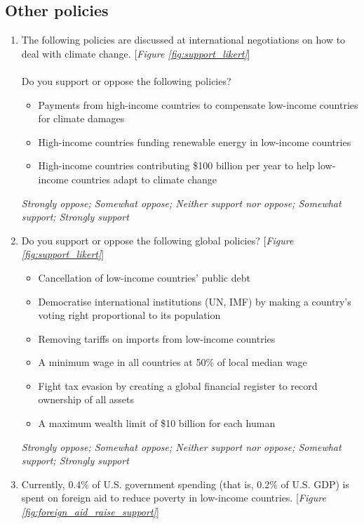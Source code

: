\subsection*{Other policies}
\begin{enumerate}[resume] \item \label{q:climate_policies} The following policies are discussed  at international negotiations on how to deal with climate change. [\textit{Figure \ref{fig:support_likert}}]\\
\\
Do you support or oppose the following policies?
\begin{itemize}
    \item Payments from high-income countries to compensate low-income countries for climate damages 
    \item High-income countries funding renewable energy in low-income countries
    \item High-income countries contributing \$100 billion per year to help low-income countries adapt to climate change
\end{itemize}
\textit{Strongly oppose; Somewhat oppose; Neither support nor oppose; Somewhat support; Strongly support}
\item \label{q:other_policies} Do you support or oppose the following global policies? [\textit{Figure \ref{fig:support_likert}}]
\begin{itemize}
    \item Cancellation of low-income countries' public debt 
    \item Democratise international institutions (UN, IMF) by making a country's voting right proportional to its population 
    \item Removing tariffs on imports from low-income countries
    \item A minimum wage in all countries at 50\% of local median wage
    \item Fight tax evasion by creating a global financial register to record ownership of all assets
    \item A maximum wealth limit of \$10 billion for each human 
\end{itemize}
\textit{Strongly oppose; Somewhat oppose; Neither support nor oppose; Somewhat support; Strongly support}
\item \label{q:foreign_aid_raise_support} Currently, 0.4\% of U.S. government spending (that is, 0.2\% of U.S. GDP) is spent on foreign aid to reduce poverty in low-income countries. [\textit{Figure \ref{fig:foreign_aid_raise_support}}]\\

\end{enumerate}
